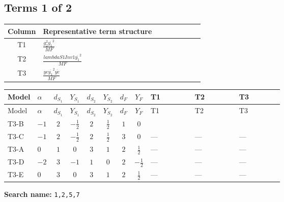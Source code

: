 \documentclass[8pt]{article}
\begin{document}
\begin{landscape}
\subsection*{Terms 1 of 2}
\begin{center}
\begin{tabular}{@{}c >{\raggedright\arraybackslash}p{0.82\linewidth}@{}}
\toprule
Column & Representative term structure \\
\midrule
T1 & \(\displaystyle \frac{g_{2}^{2} \overline{y_{1}}^{2}}{MF}\) \\
\midrule
T2 & \(\displaystyle \frac{lambdaS1Inv1 \overline{y_{1}}^{2}}{MF}\) \\
\midrule
T3 & \(\displaystyle \frac{ye \overline{y_{1}}^{2} \overline{ye}}{MF}\) \\
\midrule
\bottomrule
\end{tabular}
\end{center}
\smallskip
\tiny
\begin{longtable}{@{}llcccccc >{\raggedright\arraybackslash}p{0.21\linewidth} >{\raggedright\arraybackslash}p{0.21\linewidth} >{\raggedright\arraybackslash}p{0.21\linewidth}@{}}
\toprule
Model & $\alpha$ & $d_{S_1}$ & $Y_{S_1}$ & $d_{S_2}$ & $Y_{S_2}$ & $d_F$ & $Y_F$ & T1 & T2 & T3 \\
\midrule
\endfirsthead
\toprule
Model & $\alpha$ & $d_{S_1}$ & $Y_{S_1}$ & $d_{S_2}$ & $Y_{S_2}$ & $d_F$ & $Y_F$ & T1 & T2 & T3 \\
\midrule
\endhead
T3-B & $-1$ & $2$ & $-\frac{1}{2}$ & $2$ & $\frac{1}{2}$ & $1$ & $0$ & \scriptsize\adjustbox{max width=\linewidth}{$\begin{gathered} - \frac{3 g_{2}^{2} \overline{y_{1}}^{2}}{8 MF}\end{gathered}$} & \scriptsize\adjustbox{max width=\linewidth}{$\begin{gathered} - \frac{lambdaS1Inv1 \overline{y_{1}}^{2}}{4 MF}\end{gathered}$} & \scriptsize\adjustbox{max width=\linewidth}{$\begin{gathered} \frac{ye \overline{y_{1}}^{2} \overline{ye}}{8 MF}\end{gathered}$} \\
\midrule
T3-C & $-1$ & $2$ & $-\frac{1}{2}$ & $2$ & $\frac{1}{2}$ & $3$ & $0$ & --- & --- & --- \\
\midrule
T3-A & $0$ & $1$ & $0$ & $3$ & $1$ & $2$ & $\frac{1}{2}$ & --- & --- & --- \\
\midrule
T3-D & $-2$ & $3$ & $-1$ & $1$ & $0$ & $2$ & $-\frac{1}{2}$ & --- & --- & --- \\
\midrule
T3-E & $0$ & $3$ & $0$ & $3$ & $1$ & $2$ & $\frac{1}{2}$ & --- & --- & --- \\
\midrule
\bottomrule
\end{longtable}
\clearpage
\noindent\textbf{Search name: }\texttt{1,2,5,7}\par\smallskip

\end{landscape}
\end{document}
